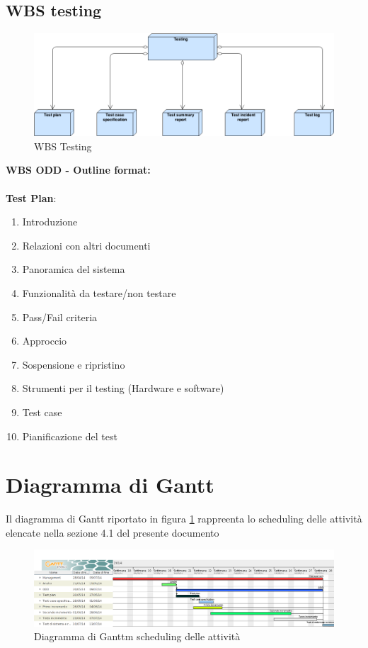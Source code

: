 \subsection{WBS testing}
\begin{figure}[ht]
\centering
\includegraphics[width=\textwidth]{img/WBS_testing.png}
\caption{WBS Testing} 
\end{figure}
\textbf{WBS ODD - Outline format:}\\ \\
\textbf{Test Plan}:
\begin{enumerate}
\item Introduzione
\item Relazioni con altri documenti
\item Panoramica del sistema
\item Funzionalità da testare/non testare
\item Pass/Fail criteria
\item Approccio
\item Sospensione e ripristino
\item Strumenti per il testing (Hardware e software)
\item Test case
\item Pianificazione del test
\end{enumerate}
\clearpage

\section{Diagramma di Gantt}
Il diagramma di Gantt riportato in figura \ref{gantMain} rappreenta lo scheduling delle attività elencate nella sezione 4.1 del presente documento
\begin{figure}[ht]
\centering
\includegraphics[width=\textwidth]{Gantt/Generic.png} 
\caption{Diagramma di Ganttm scheduling delle attività}
\label{gantMain}
\end{figure}

